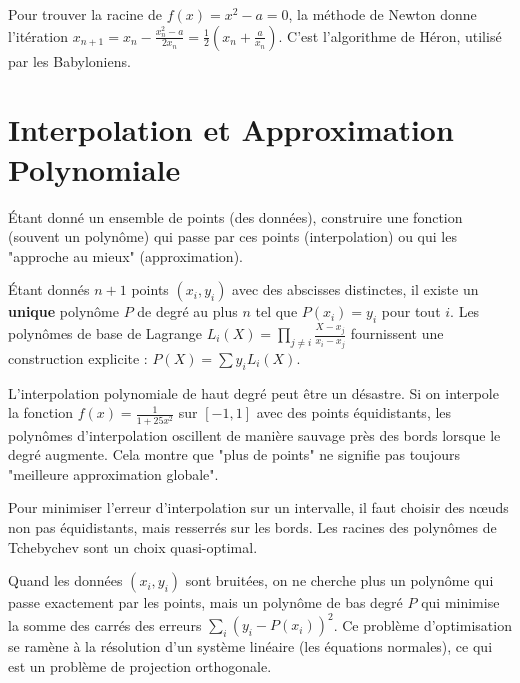 \begin{application}
    Pour trouver la racine de $f(x)=x^2-a=0$, la méthode de Newton donne l'itération $x_{n+1} = x_n - \frac{x_n^2-a}{2x_n} = \frac{1}{2}(x_n + \frac{a}{x_n})$. C'est l'algorithme de Héron, utilisé par les Babyloniens.
\end{application}

\section{Interpolation et Approximation Polynomiale}

\begin{objectif}
    Étant donné un ensemble de points (des données), construire une fonction (souvent un polynôme) qui passe par ces points (interpolation) ou qui les "approche au mieux" (approximation).
\end{objectif}

\begin{theorem}
    Étant donnés $n+1$ points $(x_i, y_i)$ avec des abscisses distinctes, il existe un \textbf{unique} polynôme $P$ de degré au plus $n$ tel que $P(x_i)=y_i$ pour tout $i$.
    Les polynômes de base de Lagrange $L_i(X) = \prod_{j \neq i} \frac{X-x_j}{x_i-x_j}$ fournissent une construction explicite : $P(X) = \sum y_i L_i(X)$.
\end{theorem}

\begin{remark}
    L'interpolation polynomiale de haut degré peut être un désastre. Si on interpole la fonction $f(x)=\frac{1}{1+25x^2}$ sur $[-1,1]$ avec des points équidistants, les polynômes d'interpolation oscillent de manière sauvage près des bords lorsque le degré augmente. Cela montre que "plus de points" ne signifie pas toujours "meilleure approximation globale".
\end{remark}

\begin{proposition}
    Pour minimiser l'erreur d'interpolation sur un intervalle, il faut choisir des nœuds non pas équidistants, mais resserrés sur les bords. Les racines des polynômes de Tchebychev sont un choix quasi-optimal.
\end{proposition}

\begin{application}
    Quand les données $(x_i, y_i)$ sont bruitées, on ne cherche plus un polynôme qui passe exactement par les points, mais un polynôme de bas degré $P$ qui minimise la somme des carrés des erreurs $\sum_i (y_i - P(x_i))^2$. Ce problème d'optimisation se ramène à la résolution d'un système linéaire (les équations normales), ce qui est un problème de projection orthogonale.
\end{application}

